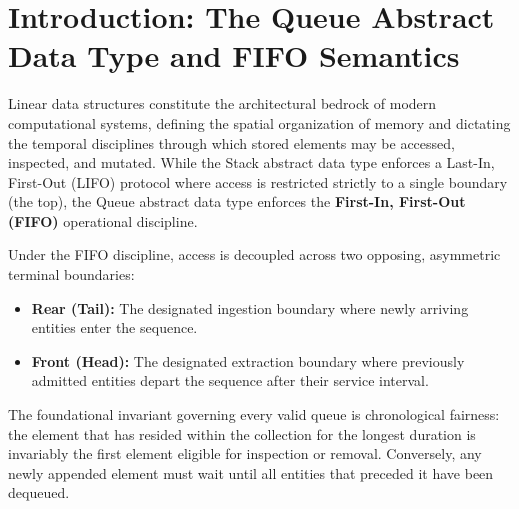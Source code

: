 \documentclass[10pt,journal,compsoc,onecolumn]{IEEEtran}
\begin{document}
\section{Introduction: The Queue Abstract Data Type and FIFO Semantics}
\label{sec:intro}

Linear data structures constitute the architectural bedrock of modern computational systems, defining the spatial organization of memory and dictating the temporal disciplines through which stored elements may be accessed, inspected, and mutated. While the Stack abstract data type enforces a Last-In, First-Out (LIFO) protocol where access is restricted strictly to a single boundary (the top), the Queue abstract data type enforces the \textbf{First-In, First-Out (FIFO)} operational discipline.

Under the FIFO discipline, access is decoupled across two opposing, asymmetric terminal boundaries:
\begin{itemize}
    \item \textbf{Rear (Tail):} The designated ingestion boundary where newly arriving entities enter the sequence.
    \item \textbf{Front (Head):} The designated extraction boundary where previously admitted entities depart the sequence after their service interval.
\end{itemize}

The foundational invariant governing every valid queue is chronological fairness: the element that has resided within the collection for the longest duration is invariably the first element eligible for inspection or removal. Conversely, any newly appended element must wait until all entities that preceded it have been dequeued.
\end{document}
